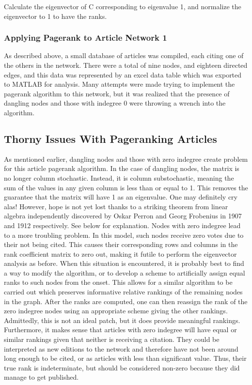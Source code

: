 \documentclass[14pt]{article} %
\begin{document}
  Calculate the eigenvector of C corresponding to eigenvalue 1, and normalize the eigenvector to 1 to have the ranks.%
  
    \subsubsection{Applying Pagerank to Article Network 1}
    \indent As described above, a small database of articles was compiled, each citing one of the others in the network. There were a total of nine nodes, and eighteen directed edges, and this data was represented by an excel data table which was exported to MATLAB for analysis. Many attempts were made trying to implement the pagerank algorithm to this network, but it was realized that the presence of dangling nodes and those with indegree 0 were throwing a wrench into the algorithm. 
  \subsection{Thorny Issues With Pageranking Articles}
    As mentioned earlier, dangling nodes and those with zero indegree create problem for this article pagerank algorithm. In the case of dangling nodes, the matrix is no longer column stochastic. Instead, it is column substochastic, meaning the sum of the values in any given column is less than or equal to 1. This removes the guarantee that the matrix will have 1 as an eigenvalue. One may definitely cry alas! However, hope is not yet lost thanks to a striking theorem from linear algebra independently discovered by Oskar Perron and Georg Frobenius in 1907 and 1912 respectively. See below for explanation. 
    Nodes with zero indegree lead to a more troubling problem. In this model, such nodes receive zero votes due to their not being cited. This causes their corresponding rows and columns in the rank coefficient matrix to zero out, making it futile to perform the eigenvector analysis as before. When this situation is encountered, it is probably best to find a way to modify the algorithm, or to develop a scheme to artificially assign equal ranks to such nodes from the onset. This allows for a similar algorithm to be carried out which preserves informative relative rankings of the remaining nodes in the graph. After the ranks are computed, one can then reassign the rank of the zero indegree nodes using an appropriate scheme giving the other rankings. Admittedly, this is not an ideal patch, but it does provide meaningful rankings. Furthermore, it makes sense that articles with zero indegree will have equal or similar rankings given that neither is receiving a citation. They could be interpreted as new editions to the network and therefore have not been around long enough to be cited, or as articles with less than significant value. Thus, their true rank is indeterminate, but should be considered non-zero because they did manage to get published.
    
\end{document}
